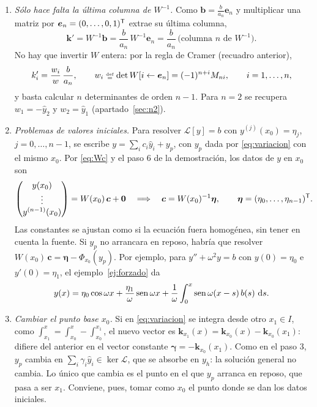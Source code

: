 \documentclass[11pt,twoside]{article}
\newcommand\Lop{\mathcal L}
\newcommand\yh{\hat y}
\newcommand\vk{\bm k}
\newcommand\vc{\bm c}
\newcommand\vb{\bm b}
\newcommand\ve{\bm e}
\newcommand\vgamma{\bm\gamma}
\newcommand\mat[1]{\begin{pmatrix}#1\end{pmatrix}}
\begin{document}
\begin{observacion}\label{obs:variacion}
\begin{enumerate}[label=(\roman*)]
\item \emph{Sólo hace falta la última columna de $W^{-1}$.} Como $\vb=\frac{b}{a_n}\ve_n$ y multiplicar una matriz por
$\ve_n=(0,\dots,0,1)\T$ extrae su última columna,
\begin{equation*}
\vk'=W^{-1}\vb=\frac{b}{a_n}\,W^{-1}\ve_n=\frac{b}{a_n}\,\big(\text{columna }n\text{ de }W^{-1}\big).
\end{equation*}
No hay que invertir $W$ entera: por la regla de Cramer (recuadro anterior),
\begin{equation}\label{eq:cramer}
k_i'=\frac{w_i}{w}\,\frac{b}{a_n},\qquad w_i\defeq\det W[i\leftarrow\ve_n]=(-1)^{n+i}M_{ni},\qquad i=1,\dots,n,
\end{equation}
y basta calcular $n$ determinantes de orden $n-1$. Para $n=2$ se recupera $w_1=-\yh_2$ y $w_2=\yh_1$
(apartado~\ref{sec:n2}).
\item \emph{Problemas de valores iniciales.} Para resolver $\Lop[y]=b$ con $y^{(j)}(x_0)=\eta_j$, $j=0,\dots,n-1$, se
escribe $y=\sum_ic_i\yh_i+y_p$, con $y_p$ dada por \eqref{eq:variacion} con el mismo $x_0$. Por \eqref{eq:Wc} y el paso 6
de la demostración, los datos de $y$ en $x_0$ son
\begin{equation*}
\mat{y(x_0)\\ \vdots\\ y^{(n-1)}(x_0)}=W(x_0)\,\vc+\bm0\quad\Longrightarrow\quad\vc=W(x_0)^{-1}\bm\eta,\qquad
\bm\eta=(\eta_0,\dots,\eta_{n-1})\T.
\end{equation*}
Las constantes se ajustan como si la ecuación fuera homogénea, sin tener en cuenta la fuente. Si $y_p$ no arrancara en
reposo, habría que resolver $W(x_0)\,\vc=\bm\eta-\Phi_{x_0}(y_p)$. Por ejemplo, para $y''+\omega^2y=b$ con $y(0)=\eta_0$ e
$y'(0)=\eta_1$, el ejemplo~\ref{ej:forzado} da
\begin{equation*}
y(x)=\eta_0\cos\omega x+\frac{\eta_1}{\omega}\operatorname{sen}\omega x+\frac1\omega\int_0^x\operatorname{sen}\omega(x-s)\,b(s)\,\mathop{}\!\mathrm{d} s.
\end{equation*}
\item \emph{Cambiar el punto base $x_0$.} Si en \eqref{eq:variacion} se integra desde otro $x_1\in I$, como
$\int_{x_1}^x=\int_{x_0}^x-\int_{x_0}^{x_1}$, el nuevo vector es $\vk_{x_1}(x)=\vk_{x_0}(x)-\vk_{x_0}(x_1)$: difiere del
anterior en el vector constante $\vgamma=-\vk_{x_0}(x_1)$. Como en el paso 3, $y_p$ cambia en $\sum_i\gamma_i\yh_i\in\ker\Lop$,
que se absorbe en $y_h$: la solución general no cambia. Lo único que cambia es el punto en el que $y_p$ arranca en reposo,
que pasa a ser $x_1$. Conviene, pues, tomar como $x_0$ el punto donde se dan los datos iniciales.
\end{enumerate}
\end{observacion}
\end{document}
